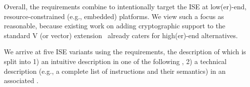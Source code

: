 \noindent
Overall, the requirements combine to intentionally target the ISE at 
 low(er)-end,
resource-constrained (e.g., embedded) platforms.  
We view such a focus as reasonable, because existing work on adding
cryptographic support to the
standard V 
(or vector) 
extension~\cite[Section 21]{RV:ISA:I:19}
already caters for
high(er)-end
alternatives.

We arrive at five ISE variants using the requirements, the description of 
which is split into
1) an 
   intuitive 
   description in one of the following \SEC[s],
2) a
   technical
   description
   (e.g., a complete list of instructions and their semantics)
   in an associated \APPX.

